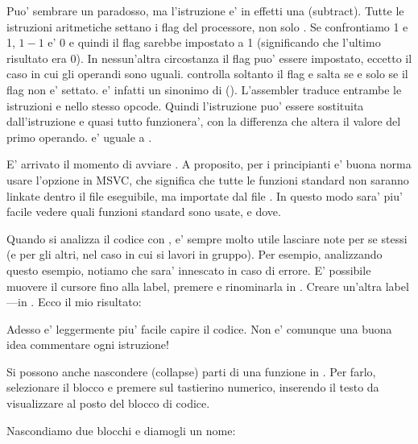 \label{CMPandSUB}
Puo' sembrare un paradosso, ma l'istruzione \CMP e' in effetti una \SUB (subtract).
Tutte le istruzioni aritmetiche settano i flag del processore, non solo \CMP.
Se confrontiamo 1 e 1, $1-1$ e' 0 e quindi il flag \ZF sarebbe impostato a 1 (significando che l'ultimo risultato era 0).
In nessun'altra circostanza il flag \ZF puo' essere impostato, eccetto il caso in cui gli operandi sono uguali.
\JNE controlla soltanto il flag \ZF e salta se e solo se il flag non e' settato.  \JNE e' infatti un sinonimo di \JNZ ().
L'assembler traduce entrambe le istruzioni \JNE e \JNZ nello stesso opcode.
Quindi l'istruzione \CMP puo' essere sostituita dall'istruzione \SUB e quasi tutto funzionera', con la differenza che \SUB altera il valore del primo operando.
\CMP e' uguale a .


E' arrivato il momento di avviare \IDA. A proposito, per i principianti e' buona norma usare l'opzione  in MSVC, che significa che tutte le funzioni
standard non saranno linkate dentro il file eseguibile, ma importate dal file .
In questo modo sara' piu' facile vedere quali funzioni standard sono usate, e dove.

Quando si analizza il codice con \IDA, e' sempre molto utile lasciare note per se stessi (e per gli altri, nel caso in cui si lavori in gruppo).
Per esempio, analizzando questo esempio, notiamo che 
 sara' innescato in caso di errore.
E' possibile muovere il cursore fino alla label, premere  e rinominarla in .
Creare un'altra label ---in .
Ecco il mio risultato:



Adesso e' leggermente piu' facile capire il codice.
Non e' comunque una buona idea commentare ogni istruzione!

Si possono anche nascondere (collapse) parti di una funzione in \IDA.
Per farlo, selezionare il blocco e premere \q{--} sul tastierino numerico, inserendo il testo da visualizzare al posto del blocco di codice.

Nascondiamo due blocchi e diamogli un nome:



